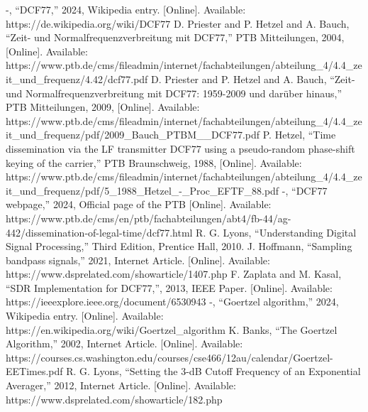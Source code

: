 \documentclass[conference]{IEEEtran}
\begin{document}
\begin{thebibliography}{00}
 -, ``DCF77,'' 2024, Wikipedia entry. [Online]. Available: https://de.wikipedia.org/wiki/DCF77
 D. Priester and P. Hetzel and A. Bauch, ``Zeit- und Normalfrequenzverbreitung mit DCF77,'' PTB Mitteilungen, 2004, [Online]. Available: https://www.ptb.de/cms/fileadmin/internet/fachabteilungen/abteilung\_4/4.4\_zeit\_und\_frequenz/4.42/dcf77.pdf
 D. Priester and P. Hetzel and A. Bauch, ``Zeit- und Normalfrequenzverbreitung mit DCF77: 1959-2009 und darüber hinaus,'' PTB Mitteilungen, 2009, [Online]. Available: https://www.ptb.de/cms/fileadmin/internet/fachabteilungen/abteilung\_4/4.4\_zeit\_und\_frequenz/pdf/2009\_Bauch\_PTBM\_\_DCF77.pdf
 P. Hetzel, ``Time dissemination via the LF transmitter DCF77 using a pseudo-random phase-shift keying of the carrier,'' PTB Braunschweig, 1988, [Online]. Available: https://www.ptb.de/cms/fileadmin/internet/fachabteilungen/abteilung\_4/4.4\_zeit\_und\_frequenz/pdf/5\_1988\_Hetzel\_-\_Proc\_EFTF\_88.pdf
 -, ``DCF77 webpage,'' 2024, Official page of the PTB [Online]. Available: https://www.ptb.de/cms/en/ptb/fachabteilungen/abt4/fb-44/ag-442/dissemination-of-legal-time/dcf77.html
 R. G. Lyons, ``Understanding Digital Signal Processing,'' Third Edition, Prentice Hall, 2010.
 J. Hoffmann, ``Sampling bandpass signals,'' 2021, Internet Article. [Online]. Available: https://www.dsprelated.com/showarticle/1407.php
 F. Zaplata and M. Kasal, ``SDR Implementation for DCF77,'', 2013, IEEE Paper. [Online]. Available: https://ieeexplore.ieee.org/document/6530943
 -, ``Goertzel algorithm,'' 2024, Wikipedia entry. [Online]. Available: https://en.wikipedia.org/wiki/Goertzel\_algorithm
 K. Banks, ``The Goertzel Algorithm,'' 2002, Internet Article. [Online]. Available: https://courses.cs.washington.edu/courses/cse466/12au/calendar/Goertzel-EETimes.pdf
 R. G. Lyons, ``Setting the 3-dB Cutoff Frequency of an Exponential Averager,'' 2012, Internet Article. [Online]. Available: https://www.dsprelated.com/showarticle/182.php
\end{thebibliography}
\end{document}
